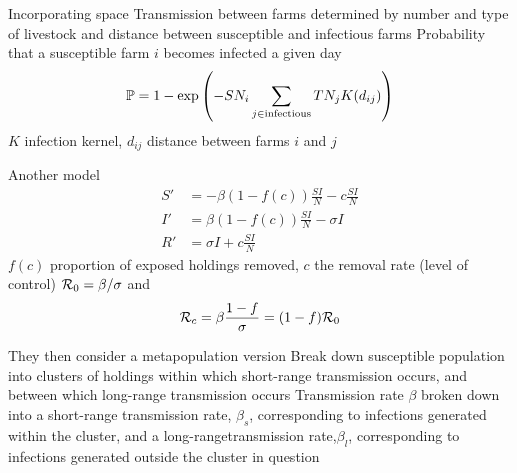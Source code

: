 \documentclass[aspectratio=43]{beamer}
\begin{document}


\begin{frame}{Incorporating space}
	Transmission between farms determined by number and type of livestock and distance between susceptible and infectious farms
	\vfill
	Probability that a susceptible farm $i$ becomes infected a given day
	\begin{equation}
		\mathbb{P} = 1-\exp\left(
			-SN_i\sum_{j\in\text{infectious}}
			TN_jK(d_{ij})
		\right)
	\end{equation}
	$K$ infection kernel, $d_{ij}$ distance between farms $i$ and $j$
\end{frame}



\begin{frame}{Another model}
	\begin{subequations}
		\begin{align}
			S' &= -\beta(1-f(c))\frac{SI}{N}-c\frac{SI}{N} \\
			I' &= \beta(1-f(c))\frac{SI}{N}-\sigma I \\
			R' &= \sigma I+c\frac{SI}{N}
		\end{align}
	\end{subequations}
	\vfill
	$f(c)$ proportion of exposed holdings removed, $c$ the removal rate (level of control)
	\vfill
	$\mathcal{R}_0=\beta/\sigma$ and 
	\[
		\mathcal{R}_c=\beta\frac{1-f}{\sigma}=(1-f)\mathcal{R}_0
	\]
\end{frame}

\begin{frame}{They then consider a metapopulation version}
	Break down susceptible population into clusters of holdings within which short-range transmission occurs, and between which long-range transmission occurs
	\vfill 
	Transmission rate $\beta$  broken  down into a short-range transmission rate, $\beta_s$, corresponding to infections generated within the cluster, and a long-rangetransmission  rate,$\beta_l$,  corresponding  to  infections  generated outside the cluster in question
\end{frame}
\end{document}
